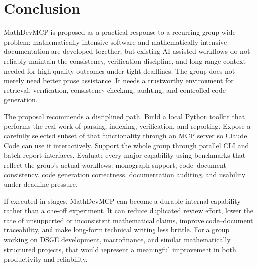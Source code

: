 \chapter{Conclusion}

MathDevMCP is proposed as a practical response to a recurring group-wide problem: mathematically intensive software and mathematically intensive documentation are developed together, but existing AI-assisted workflows do not reliably maintain the consistency, verification discipline, and long-range context needed for high-quality outcomes under tight deadlines. The group does not merely need better prose assistance. It needs a trustworthy environment for retrieval, verification, consistency checking, auditing, and controlled code generation.

The proposal recommends a disciplined path. Build a local Python toolkit that performs the real work of parsing, indexing, verification, and reporting. Expose a carefully selected subset of that functionality through an MCP server so Claude Code can use it interactively. Support the whole group through parallel CLI and batch-report interfaces. Evaluate every major capability using benchmarks that reflect the group's actual workflows: monograph support, code--document consistency, code generation correctness, documentation auditing, and usability under deadline pressure.

If executed in stages, MathDevMCP can become a durable internal capability rather than a one-off experiment. It can reduce duplicated review effort, lower the rate of unsupported or inconsistent mathematical claims, improve code--document traceability, and make long-form technical writing less brittle. For a group working on DSGE development, macrofinance, and similar mathematically structured projects, that would represent a meaningful improvement in both productivity and reliability.
